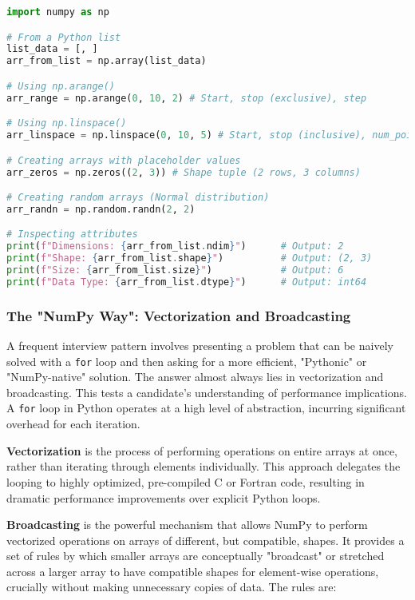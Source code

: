 \documentclass[11pt,a4paper]{article}
\begin{document}
\begin{lstlisting}[language=Python, caption=Array Creation and Attribute Inspection]
import numpy as np

# From a Python list
list_data = [, ]
arr_from_list = np.array(list_data)

# Using np.arange()
arr_range = np.arange(0, 10, 2) # Start, stop (exclusive), step

# Using np.linspace()
arr_linspace = np.linspace(0, 10, 5) # Start, stop (inclusive), num_points

# Creating arrays with placeholder values
arr_zeros = np.zeros((2, 3)) # Shape tuple (2 rows, 3 columns)

# Creating random arrays (Normal distribution)
arr_randn = np.random.randn(2, 2)

# Inspecting attributes
print(f"Dimensions: {arr_from_list.ndim}")      # Output: 2
print(f"Shape: {arr_from_list.shape}")          # Output: (2, 3)
print(f"Size: {arr_from_list.size}")            # Output: 6
print(f"Data Type: {arr_from_list.dtype}")      # Output: int64
\end{lstlisting}

\subsubsection{The "NumPy Way": Vectorization and Broadcasting}

A frequent interview pattern involves presenting a problem that can be naively solved with a \texttt{for} loop and then asking for a more efficient, "Pythonic" or "NumPy-native" solution. The answer almost always lies in vectorization and broadcasting. This tests a candidate's understanding of performance implications. A \texttt{for} loop in Python operates at a high level of abstraction, incurring significant overhead for each iteration.

\textbf{Vectorization} is the process of performing operations on entire arrays at once, rather than iterating through elements individually. This approach delegates the looping to highly optimized, pre-compiled C or Fortran code, resulting in dramatic performance improvements over explicit Python loops.

\textbf{Broadcasting} is the powerful mechanism that allows NumPy to perform vectorized operations on arrays of different, but compatible, shapes. It provides a set of rules by which smaller arrays are conceptually "broadcast" or stretched across a larger array to have compatible shapes for element-wise operations, crucially without making unnecessary copies of data. The rules are:
\end{document}
